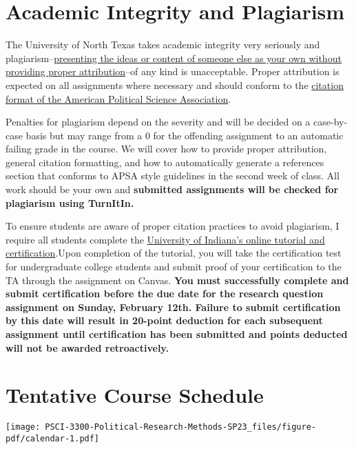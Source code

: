 \documentclass[12pt,]{article}
\makeatletter
\def\maxwidth{\ifdim\Gin@nat@width>\linewidth\linewidth
\else\Gin@nat@width\fi}
\let\Oldincludegraphics\includegraphics
\renewcommand{\includegraphics}[1]{\Oldincludegraphics[width=\maxwidth]{#1}}
\makeatother
\begin{document}
\hypertarget{academic-integrity-and-plagiarism}{%
\section{Academic Integrity and
Plagiarism}\label{academic-integrity-and-plagiarism}}

\noindent The University of North Texas takes academic integrity very
seriously and
plagiarism--\href{https://guides.library.unt.edu/plagiarism/home}{presenting
the ideas or content of someone else as your own without providing
proper attribution}--of any kind is unacceptable. Proper attribution is
expected on all assignments where necessary and should conform to the
\href{https://connect.apsanet.org/stylemanual/}{citation format of the
American Political Science Association}.

Penalties for plagiarism depend on the severity and will be decided on a
case-by-case basis but may range from a 0 for the offending assignment
to an automatic failing grade in the course. We will cover how to
provide proper attribution, general citation formatting, and how to
automatically generate a references section that conforms to APSA style
guidelines in the second week of class. All work should be your own and
\textbf{submitted assignments will be checked for plagiarism using
TurnItIn.}

To ensure students are aware of proper citation practices to avoid
plagiarism, I require all students complete the
\href{https://www.indiana.edu/˜academy/firstPrinciples/index.html}{University
of Indiana's online tutorial and certification}.Upon completion of the
tutorial, you will take the certification test for undergraduate college
students and submit proof of your certification to the TA through the
assignment on Canvas. \textbf{You must successfully complete and submit
certification before the due date for the research question assignment
on Sunday, February 12th. Failure to submit certification by this date
will result in 20-point deduction for each subsequent assignment until
certification has been submitted and points deducted will not be awarded
retroactively.}

\hypertarget{tentative-course-schedule}{%
\section{Tentative Course Schedule}\label{tentative-course-schedule}}

\texttt{[image: PSCI-3300-Political-Research-Methods-SP23\_files/figure-pdf/calendar-1.pdf]}
\end{document}
